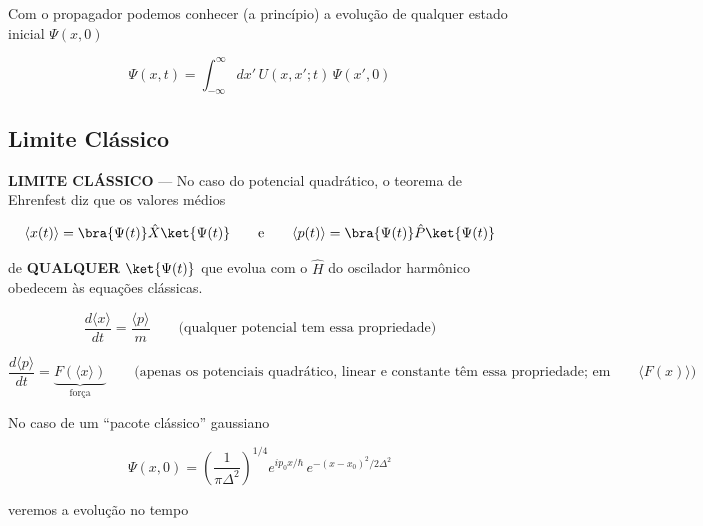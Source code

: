 Com o propagador podemos conhecer (a princípio) a evolução de qualquer estado inicial $\Psi(x,0)$

\begin{equation}
    \Psi(x,t) = \int_{-\infty}^{\infty} dx' \, U(x,x';t)\,\Psi(x',0)
\label{eq:aula16_evolucao_via_propagador}
\end{equation}

\subsection*{Limite Clássico}

\textbf{LIMITE CLÁSSICO} --- No caso do potencial quadrático, o teorema de Ehrenfest diz que os valores médios

\begin{equation}
    \langle x(t) \rangle = \bra{\Psi(t)} \hat{X} \ket{\Psi(t)} \qquad \text{e} \qquad \langle p(t) \rangle = \bra{\Psi(t)} \hat{P} \ket{\Psi(t)}
\label{eq:aula16_ehrenfest_valores_medios}
\end{equation}

de \textbf{QUALQUER} $\ket{\Psi(t)}$ que evolua com o $\hat{H}$ do oscilador harmônico obedecem às equações clássicas.

\begin{equation}
    \frac{d\langle x \rangle}{dt} = \frac{\langle p \rangle}{m} \qquad \text{(qualquer potencial tem essa propriedade)}
\label{eq:aula16_ehrenfest_dxdt}
\end{equation}

\begin{equation}
    \frac{d\langle p \rangle}{dt} = \underbrace{F(\langle x \rangle)}_{\text{força}} \qquad \text{(apenas os potenciais quadrático, linear e constante têm essa propriedade; em geral o lado direito é } \langle F(x) \rangle \text{)}
\label{eq:aula16_ehrenfest_dpdt}
\end{equation}

No caso de um ``pacote clássico'' gaussiano

\begin{equation}
    \Psi(x,0) = \left( \frac{1}{\pi\Delta^2} \right)^{1/4} e^{ip_0 x/\hbar}\, e^{-(x-x_0)^2/2\Delta^2}
\label{eq:aula16_pacote_gaussiano}
\end{equation}

veremos a evolução no tempo

